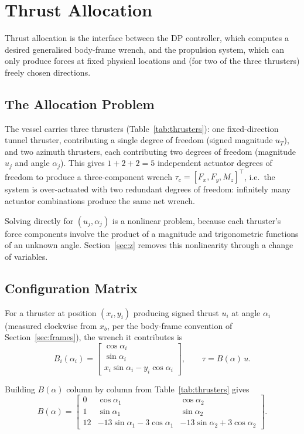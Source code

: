 \documentclass[10pt,conference]{IEEEtran}
\begin{document}
\section{Thrust Allocation}
\label{sec:allocation}

Thrust allocation is the interface between the DP controller, which
computes a desired generalised body-frame wrench, and the propulsion
system, which can only produce forces at fixed physical locations and
(for two of the three thrusters) freely chosen directions.

\subsection{The Allocation Problem}

The vessel carries three thrusters (Table~\ref{tab:thrusters}): one
fixed-direction tunnel thruster, contributing a single degree of
freedom (signed magnitude $u_T$), and two azimuth thrusters, each
contributing two degrees of freedom (magnitude $u_j$ and angle
$\alpha_j$). This gives $1+2+2=5$ independent actuator degrees of
freedom to produce a three-component wrench $\tau_c=[F_x,F_y,M_z]^\top$,
i.e.\ the system is over-actuated with two redundant degrees of
freedom: infinitely many actuator combinations produce the same net
wrench.

Solving directly for $(u_j,\alpha_j)$ is a nonlinear problem, because
each thruster's force components involve the product of a magnitude
and trigonometric functions of an unknown angle. Section~\ref{sec:z}
removes this nonlinearity through a change of variables.

\subsection{Configuration Matrix}

For a thruster at position $(x_i,y_i)$ producing signed thrust $u_i$ at
angle $\alpha_i$ (measured clockwise from $x_b$, per the body-frame
convention of Section~\ref{sec:frames}), the wrench it contributes is
\begin{equation}
B_i(\alpha_i) = \begin{bmatrix} \cos\alpha_i \\ \sin\alpha_i \\
x_i\sin\alpha_i - y_i\cos\alpha_i \end{bmatrix}, \qquad
\tau = B(\alpha)\,u.
\label{eq:Bi}
\end{equation}

Building $B(\alpha)$ column by column from Table~\ref{tab:thrusters}
gives
\begin{equation}
B(\alpha) = \begin{bmatrix}
0 & \cos\alpha_1 & \cos\alpha_2 \\
1 & \sin\alpha_1 & \sin\alpha_2 \\
12 & -13\sin\alpha_1-3\cos\alpha_1 & -13\sin\alpha_2+3\cos\alpha_2
\end{bmatrix}.
\end{equation}
\end{document}
